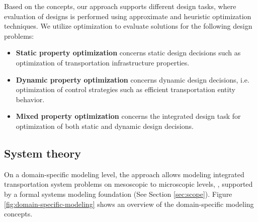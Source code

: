 \documentclass[10pt,twocolumn]{article}
\begin{document}
Based on the concepts, our approach supports different design tasks, where evaluation of designs is performed using approximate and heuristic optimization techniques. We utilize optimization to evaluate solutions for the following design problems:

\begin{itemize}
    \item \textbf{Static property optimization} concerns static design decisions such as optimization of transportation infrastructure properties.
    \item \textbf{Dynamic property optimization} concerns dynamic design decisions, i.e. optimization of control strategies such as efficient transportation entity behavior.
    \item \textbf{Mixed property optimization} concerns the integrated design task for optimization of both static and dynamic design decisions.
\end{itemize}



\subsection{System theory}
\label{sec:domain-specific-modeling}


On a domain-specific modeling level, the approach allows modeling integrated transportation system problems on mesoscopic to microscopic levels, \cite{ascher_hackenberg_2014, ascher_hackenberg_2015}, supported by a formal systems modeling foundation \cite{ascher_hackenberg_2016, ascher_hackenberg_2017} (See Section  \ref{sec:scope}).
Figure \ref{fig:domain-specific-modeling} shows an overview of the domain-specific modeling concepts.
\end{document}

